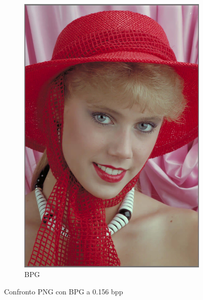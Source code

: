 \begin{figure}[h!]
\begin{subfigure}[]{0.3\textwidth}
        \includegraphics[width=\textwidth]{Immagini/IMAGES/BPG_3_IMG0004.pdf}
        \caption{BPG}
        \label{fig:CompressedBPG}
    \end{subfigure}
    \caption{Confronto PNG con BPG a 0.156 bpp}
    \label{fig:CompressionBPG}
\end{figure}

